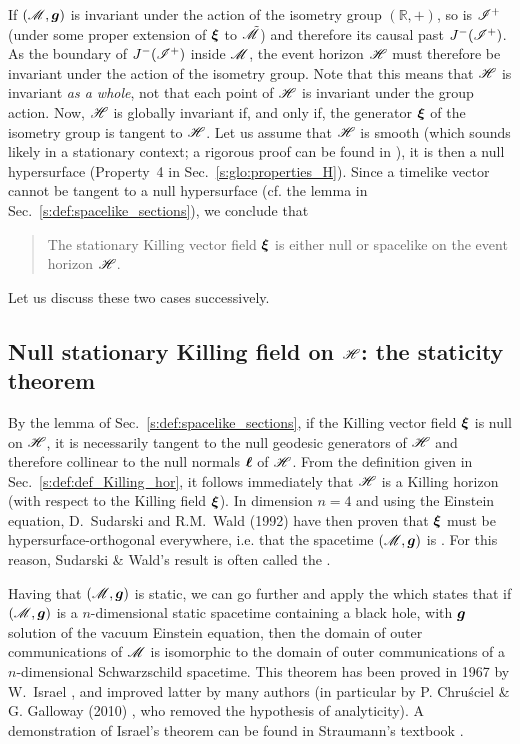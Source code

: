 If $(\mathscr{M},\bm{g})$ is invariant under the action of the isometry group $(\mathbb{R},+)$,
so is $\mathscr{I}^+$ (under some proper extension of $\bm{\xi}$ to $\tilde{\mathscr{M}}$)
and therefore its causal past $J^-(\mathscr{I}^+)$. As the boundary of $J^-(\mathscr{I}^+)$
inside $\mathscr{M}$, the event horizon $\mathscr{H}$ must therefore be invariant under the
action of the isometry group.
Note that this means that $\mathscr{H}$ is invariant \emph{as a whole}, not that
each point of $\mathscr{H}$ is invariant under the group action.
Now, $\mathscr{H}$ is globally invariant if, and only if, the
generator $\bm{\xi}$ of the isometry group is tangent to $\mathscr{H}$.
Let us assume that $\mathscr{H}$ is smooth (which sounds likely in a stationary context;
a rigorous proof can be found in \cite{ChrusDGH01}),
it is then a null hypersurface (Property~4 in Sec.~\ref{s:glo:properties_H}).
Since a timelike vector cannot be tangent to a null hypersurface (cf. the
lemma in Sec.~\ref{s:def:spacelike_sections}), we conclude that
\begin{quote}
The stationary Killing vector field  $\bm{\xi}$ is either null or spacelike on
the event horizon $\mathscr{H}$.
\end{quote}
Let us discuss these two cases successively.

\subsection{Null stationary Killing field on $\mathscr{H}$: the staticity theorem}

By the lemma of Sec.~\ref{s:def:spacelike_sections}, if the Killing vector
field $\bm{\xi}$ is null on $\mathscr{H}$, it is necessarily tangent to the null geodesic generators
of $\mathscr{H}$ and therefore collinear to the null normals $\bm{\ell}$ of $\mathscr{H}$. From the definition
given in Sec.~\ref{s:def:def_Killing_hor}, it follows immediately that
$\mathscr{H}$ is a Killing horizon (with respect to the Killing field $\bm{\xi}$).
In dimension $n=4$ and using the Einstein equation,
D.~Sudarski and R.M.~Wald (1992) \cite{SudarW92} have then proven that $\bm{\xi}$ must be
hypersurface-orthogonal everywhere, i.e. that the spacetime $(\mathscr{M},\bm{g})$ is . For this reason, Sudarski \& Wald's result is often
called the .

Having that $(\mathscr{M},\bm{g})$ is static, we can go further and
apply the 
 which
states that if $(\mathscr{M},\bm{g})$ is a $n$-dimensional static spacetime
containing a black hole, with $\bm{g}$ solution of the vacuum Einstein
equation, then the domain of outer communications of $\mathscr{M}$ is isomorphic
to the domain of outer communications of a $n$-dimensional Schwarzschild spacetime.
This theorem has been proved in 1967 by W.~Israel \cite{Israe67},
and improved latter by many authors (in particular by
P. Chru\'sciel \& G. Galloway (2010) \cite{ChrusG10}, who removed
the hypothesis of analyticity).
A demonstration of Israel's theorem can be found in Straumann's textbook \cite{Strau04}.

